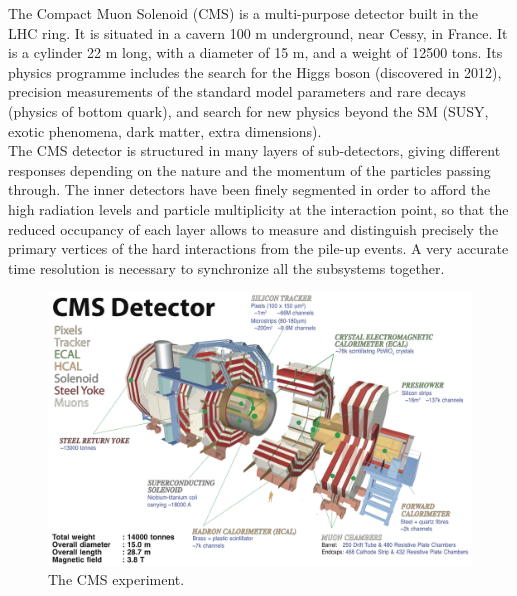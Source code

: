 The Compact Muon Solenoid (CMS) is a multi-purpose detector built in the LHC ring. It is situated in a cavern 100 m underground, near Cessy, in France. It is a cylinder 22 m long, with a diameter of 15 m, and a weight of 12500 tons. Its physics programme includes the search for the Higgs boson (discovered in 2012), precision measurements of the standard model parameters and rare decays (physics of bottom quark), and search for new physics beyond the SM (SUSY, exotic phenomena, dark matter, extra dimensions).\\
The CMS detector is structured in many layers of sub-detectors, giving different responses depending on the nature and the momentum of the particles passing through. The inner detectors have been finely segmented in order to afford the high radiation levels and particle multiplicity at the interaction point, so that the reduced occupancy of each layer allows to measure and distinguish precisely the primary vertices of the hard interactions from the pile-up events. A very accurate time resolution is necessary to synchronize all the subsystems together.\\

\begin{figure}[!htb]
  \centering
    \includegraphics[width=.99\textwidth]{figures/cms_3d.png}
  \caption{The CMS experiment.~\cite{Chatrchyan:2008zzk}}
  \label{fig:CMS_1}
\end{figure}

